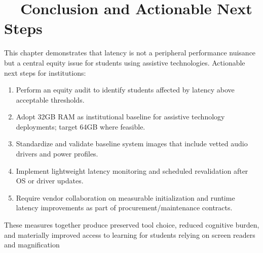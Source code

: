 \section{~~Conclusion and Actionable Next Steps}\label{chap1:conclusion-final}
This chapter demonstrates that latency is not a peripheral performance nuisance but a central equity issue for students using assistive technologies. Actionable next steps for institutions:
\begin{enumerate}
    \item Perform an equity audit to identify students affected by latency above acceptable thresholds.
    \item Adopt 32GB RAM as institutional baseline for assistive technology deployments; target 64GB where feasible.
    \item Standardize and validate baseline system images that include vetted audio drivers and power profiles.
    \item Implement lightweight latency monitoring and scheduled revalidation after OS or driver updates.
    \item Require vendor collaboration on measurable initialization and runtime latency improvements as part of procurement/maintenance contracts.
\end{enumerate}
These measures together produce preserved tool choice, reduced cognitive burden, and materially improved access to learning for students relying on screen readers and magnification